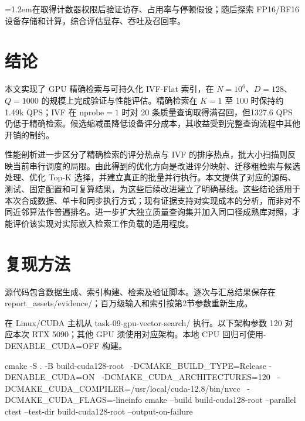 \documentclass[UTF8,a4paper,zihao=5,fontset=none]{ctexart}
\begin{document}
\par\noindent\hangindent=1.2em\textbullet\quad 在取得计数器权限后验证访存、占用率与停顿假设；随后探索 FP16/BF16 设备存储和计算，综合评估显存、吞吐及召回率。\par

\section{结论}

本文实现了 GPU 精确检索与可持久化 IVF-Flat 索引，在 $N=10^6$、$D=128$、$Q=1000$ 的规模上完成验证与性能评估。精确检索在 $K=1$ 至 100 时保持约1.49k QPS；IVF 在 $\mathrm{nprobe}=1$ 时对 20 条质量查询取得满召回，但1327.6 QPS 仍低于精确检索。候选缩减虽降低设备评分成本，其收益受到完整查询流程中其他开销的制约。


性能剖析进一步区分了精确检索的评分热点与 IVF 的排序热点，批大小扫描则反映当前串行调度的局限。由此得到的优化方向是改进评分映射、迁移粗检索与候选处理、优化 Top-K 选择，并建立真正的批量并行执行。本文提供了对应的源码、测试、固定配置和可复算结果，为这些后续改进建立了明确基线。这些结论适用于本次合成数据、单卡和同步执行方式；现有证据支持对实现成本的分析，而非对不同近邻算法作普遍排名。进一步扩大独立质量查询集并加入同口径成熟库对照，才能评价该实现对实际嵌入检索工作负载的适用程度。


\appendix

\section{复现方法}

源代码包含数据生成、索引构建、检索及验证脚本。逐次与汇总结果保存在{\small\ttfamily report\_\allowbreak{}a\allowbreak{}ssets/\allowbreak{}ev\allowbreak{}idence/\allowbreak{}}；百万级输入和索引按第2节参数重新生成。



在 Linux/CUDA 主机从 {\small\ttfamily task-\allowbreak{}09-\allowbreak{}gpu-\allowbreak{}vect\allowbreak{}or-\allowbreak{}searc\allowbreak{}h/\allowbreak{}} 执行。以下架构参数 120 对应本次 RTX 5090；其他 GPU 须使用对应架构。本地 CPU 回归可使用{\small\ttfamily -\allowbreak{}DENABLE\allowbreak{}\_\allowbreak{}CUDA=OF\allowbreak{}F} 构建。


\par{}
\begin{ReportCode}
cmake -S . -B build-cuda128-root \
  -DCMAKE_BUILD_TYPE=Release -DENABLE_CUDA=ON \
  -DCMAKE_CUDA_ARCHITECTURES=120 \
  -DCMAKE_CUDA_COMPILER=/usr/local/cuda-12.8/bin/nvcc \
  -DCMAKE_CUDA_FLAGS=-lineinfo
cmake --build build-cuda128-root --parallel
ctest --test-dir build-cuda128-root --output-on-failure
\end{ReportCode}
\end{document}
